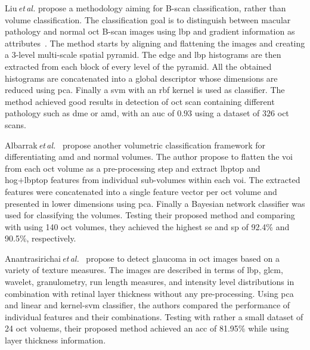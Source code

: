 %
Liu\,\textit{et\,al.} propose a methodology aiming for B-scan classification, rather than volume classification.
The classification goal is to distinguish between macular pathology and normal \gls{oct} B-scan images using \gls{lbp} and gradient information as attributes~\cite{Liu2011}.
%
The method starts by aligning and flattening the images and creating a $3$-level multi-scale spatial pyramid.
The edge and \gls{lbp} histograms are then extracted from each block of every level of the pyramid.
All the obtained histograms are concatenated into a global descriptor whose dimensions are reduced using \gls{pca}.
Finally a \gls{svm} with an \gls{rbf} kernel is used as classifier.
%
The method achieved good results in detection of \gls{oct} scan containing different pathology such as \gls{dme} or \gls{amd}, with an \gls{auc} of $0.93$ using a dataset of $326$ \gls{oct} scans.

Albarrak\,\textit{et\,al.}~\cite{albarrak2013age} propose another volumetric classification framework for differentiating \gls{amd} and normal volumes.
%
The author propose to flatten the \gls{voi} from each \gls{oct} volume as a pre-processing step and extract \gls{lbptop} and \gls{hog}+\gls{lbptop} features from individual sub-volumes within each \gls{voi}.
The extracted features were concatenated into a single feature vector per \gls{oct} volume and presented in lower dimensions using \gls{pca}.
Finally a Bayesian network classifier was used for classifying the volumes.
%
Testing their proposed method and comparing with \cite{Liu2011} using 140 \gls{oct} volumes, they achieved the highest \gls{se} and \gls{sp} of 92.4\% and 90.5\%, respectively.

Anantrasirichai\,\textit{et\,al.}~\cite{anantrasirichai2013svm} propose to detect glaucoma in \gls{oct} images based on a variety of texture measures.
%
The images are described in terms of \gls{lbp}, \gls{glcm}, wavelet, granulometry, run length measures, and intensity level distributions in combination with retinal layer thickness without any pre-processing.
Using \gls{pca} and linear and kernel-\gls{svm} classifier, the authors compared the performance of individual features and their combinations.
%
Testing with rather a small dataset of 24 \gls{oct} voluems, their proposed method achieved an \gls{acc} of 81.95\% while using layer thickness information.

